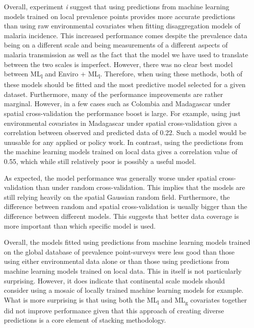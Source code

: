 \documentclass[review]{elsarticle}
\begin{document}
Overall, experiment \emph{i} suggest that using predictions from machine learning models trained on local prevalence points provides more accurate predictions than using raw environmental covariates when fitting disaggregation models of malaria incidence.
This increased performance comes despite the prevalence data being on a different scale and being measurements of a different aspects of malaria transmission as well as the fact that the model we have used to translate between the two scales is imperfect.
However, there was no clear best model between ML\textsubscript{l} and Enviro + ML\textsubscript{l}.
Therefore, when using these methods, both of these models should be fitted and the most predictive model selected for a given dataset.
Furthermore, many of the performance improvements are rather marginal. 
However, in a few cases such as Colombia and Madagascar under spatial cross-validation the performance boost is large.
For example, using just environmental covariates in Madagascar under spatial cross-validation gives a correlation between observed and predicted data of 0.22.
Such a model would be unusable for any applied or policy work.
In contrast, using the predictions from the machine learning models trained on local data gives a correlation value of 0.55, which while still relatively poor is possibly a useful model.

As expected, the model performance was generally worse under spatial cross-validation than under random cross-validation.
This implies that the models are still relying heavily on the spatial Gaussian random field.
Furthermore, the difference between random and spatial cross-validation is usually bigger than the difference between different models.
This suggests that better data coverage is more important than which specific model is used.






Overall, the models fitted using predictions from machine learning models trained on the global database of prevalence point-surveys were less good than those using either environmental data alone or than those using predictions from machine learning models trained on local data.
This in itself is not particularly surprising.
However, it does indicate that continental scale models should consider using a mosaic of locally trained machine learning models for example.
What is more surprising is that using both the ML\textsubscript{l} and ML\textsubscript{g} covariates together did not improve performance given that this approach of creating diverse predictions is a core element of stacking methodology.
\end{document}

